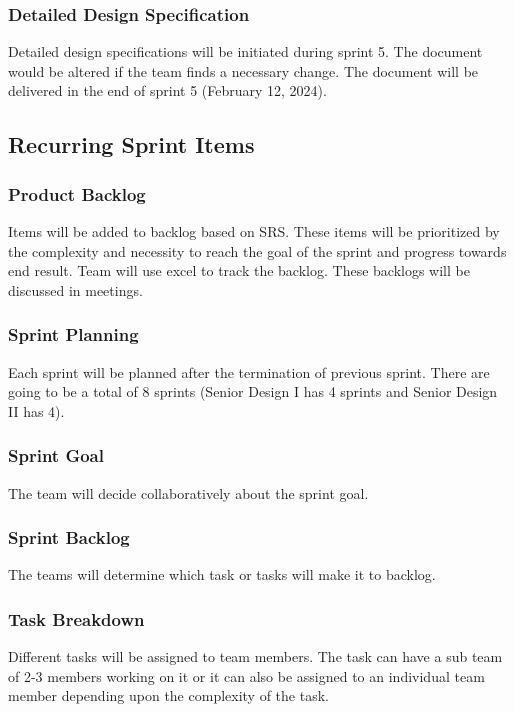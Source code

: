 \subsubsection{Detailed Design Specification}
Detailed design specifications will be initiated during sprint 5. The document would be altered if the team finds a necessary change. The document will be delivered in the end of sprint 5 (February 12, 2024).

\subsection{Recurring Sprint Items}


\subsubsection{Product Backlog}
Items will be added to backlog based on SRS. These items will be prioritized by the complexity and necessity to reach the goal of the sprint and progress towards end result. Team will use excel to track the backlog. These backlogs will be discussed in meetings. 

\subsubsection{Sprint Planning}
Each sprint will be planned after the termination of previous sprint. There are going to be a total of 8 sprints (Senior Design I has 4 sprints and Senior Design II has 4). 

\subsubsection{Sprint Goal}
The team will decide collaboratively about the sprint goal.  

\subsubsection{Sprint Backlog}
The teams will determine which task or tasks will make it to backlog. 

\subsubsection{Task Breakdown}
Different tasks will be assigned to team members. The task can have a sub team of 2-3 members working on it or it can also be assigned to an individual team member depending upon the complexity of the task. 

